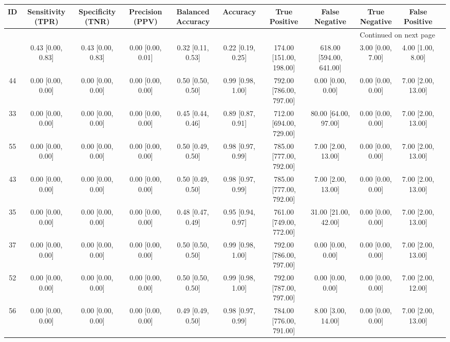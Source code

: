 \documentclass[8pt]{article}
\begin{document}
\begin{center}
\begin{footnotesize}
\begin{longtable}{|ccccccccccc|}
\toprule
 ID &  Sensitivity (TPR) &  Specificity (TNR) &    Precision (PPV) &  Balanced Accuracy &           Accuracy &            True Positive &           False Negative &      True Negative &      False Positive \\
\midrule
\endhead
\midrule
\multicolumn{10}{r}{{Continued on next page}} \\
\midrule
\endfoot

\bottomrule
\endlastfoot
 38 &  0.43 [0.00, 0.83] &  0.43 [0.00, 0.83] &  0.00 [0.00, 0.01] &  0.32 [0.11, 0.53] &  0.22 [0.19, 0.25] &  174.00 [151.00, 198.00] &  618.00 [594.00, 641.00] &  3.00 [0.00, 7.00] &   4.00 [1.00, 8.00] \\
 44 &  0.00 [0.00, 0.00] &  0.00 [0.00, 0.00] &  0.00 [0.00, 0.00] &  0.50 [0.50, 0.50] &  0.99 [0.98, 1.00] &  792.00 [786.00, 797.00] &        0.00 [0.00, 0.00] &  0.00 [0.00, 0.00] &  7.00 [2.00, 13.00] \\
 33 &  0.00 [0.00, 0.00] &  0.00 [0.00, 0.00] &  0.00 [0.00, 0.00] &  0.45 [0.44, 0.46] &  0.89 [0.87, 0.91] &  712.00 [694.00, 729.00] &     80.00 [64.00, 97.00] &  0.00 [0.00, 0.00] &  7.00 [2.00, 13.00] \\
 55 &  0.00 [0.00, 0.00] &  0.00 [0.00, 0.00] &  0.00 [0.00, 0.00] &  0.50 [0.49, 0.50] &  0.98 [0.97, 0.99] &  785.00 [777.00, 792.00] &       7.00 [2.00, 13.00] &  0.00 [0.00, 0.00] &  7.00 [2.00, 13.00] \\
 43 &  0.00 [0.00, 0.00] &  0.00 [0.00, 0.00] &  0.00 [0.00, 0.00] &  0.50 [0.49, 0.50] &  0.98 [0.97, 0.99] &  785.00 [777.00, 792.00] &       7.00 [2.00, 13.00] &  0.00 [0.00, 0.00] &  7.00 [2.00, 13.00] \\
 35 &  0.00 [0.00, 0.00] &  0.00 [0.00, 0.00] &  0.00 [0.00, 0.00] &  0.48 [0.47, 0.49] &  0.95 [0.94, 0.97] &  761.00 [749.00, 772.00] &     31.00 [21.00, 42.00] &  0.00 [0.00, 0.00] &  7.00 [2.00, 13.00] \\
 37 &  0.00 [0.00, 0.00] &  0.00 [0.00, 0.00] &  0.00 [0.00, 0.00] &  0.50 [0.50, 0.50] &  0.99 [0.98, 1.00] &  792.00 [786.00, 797.00] &        0.00 [0.00, 0.00] &  0.00 [0.00, 0.00] &  7.00 [2.00, 13.00] \\
 52 &  0.00 [0.00, 0.00] &  0.00 [0.00, 0.00] &  0.00 [0.00, 0.00] &  0.50 [0.50, 0.50] &  0.99 [0.98, 1.00] &  792.00 [787.00, 797.00] &        0.00 [0.00, 0.00] &  0.00 [0.00, 0.00] &  7.00 [2.00, 12.00] \\
 56 &  0.00 [0.00, 0.00] &  0.00 [0.00, 0.00] &  0.00 [0.00, 0.00] &  0.49 [0.49, 0.50] &  0.98 [0.97, 0.99] &  784.00 [776.00, 791.00] &       8.00 [3.00, 14.00] &  0.00 [0.00, 0.00] &  7.00 [2.00, 13.00] \\
\end{longtable}
\end{footnotesize}
\end{center}
\end{document}
